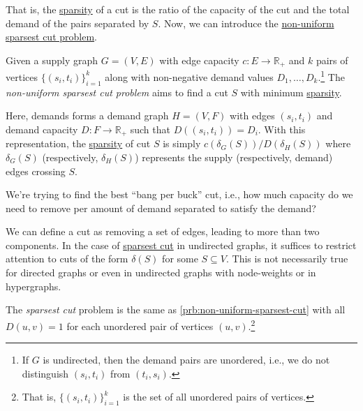 That is, the \hyperref[def:sparsity]{sparsity} of a cut is the ratio of the capacity of the cut and the total demand of the pairs separated by \(S\). Now, we can introduce the \hyperref[prb:non-uniform-sparsest-cut]{non-uniform sparsest cut problem}.

\begin{problem}\label{prb:non-uniform-sparsest-cut}
Given a supply graph \(G = (V, E)\) with edge capacity \(c \colon E \to \mathbb{R} _{+}\) and \(k\) pairs of vertices \(\{ (s_i, t_i) \} _{i=1}^{k}\) along with non-negative demand values \(D_1, \dots , D_k\).\footnote{If \(G\) is undirected, then the demand pairs are unordered, i.e., we do not distinguish \((s_i, t_i)\) from \((t_i, s_i)\).} The \emph{non-uniform sparsest cut problem} aims to find a cut \(S\) with minimum \hyperref[def:sparsity]{sparsity}.
\end{problem}

Here, demands forms a demand graph \(H = (V, F)\) with edges \((s_i, t_i)\) and demand capacity \(D\colon F \to \mathbb{R} _{+}\) such that \(D((s_i, t_i)) = D_i\). With this representation, the \hyperref[def:sparsity]{sparsity} of cut \(S\) is simply \(c(\delta _G(S)) / D(\delta _H(S))\) where \(\delta _G(S)\) (respectively, \(\delta _H(S)\)) represents the supply (respectively, demand) edges crossing \(S\).

\begin{intuition}
	We're trying to find the best ``bang per buck''	cut, i.e., how much capacity do we need to remove per amount of demand separated to satisfy the demand?
\end{intuition}

\begin{remark}
	We can define a cut as removing a set of edges, leading to more than two components. In the case of \hyperref[prb:non-uniform-sparsest-cut]{sparsest cut} in undirected graphs, it suffices to restrict attention to cuts of the form \(\delta (S)\) for some \(S \subseteq V\). This is not necessarily true for directed graphs or even in undirected graphs with node-weights or in hypergraphs.
\end{remark}

\begin{problem}\label{prb:sparsest-cut}
The \emph{sparsest cut} problem is the same as \autoref{prb:non-uniform-sparsest-cut} with all \(D(u, v) = 1\) for each unordered pair of vertices \((u, v)\).\footnote{That is, \(\{ (s_i, t_i) \} _{i=1}^{k}\) is the set of all unordered pairs of vertices.}
\end{problem}

